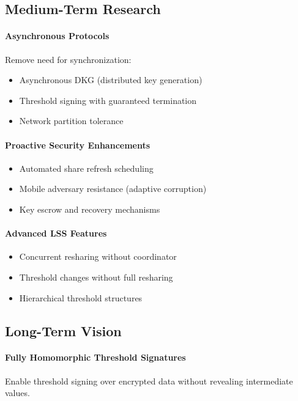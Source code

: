 \documentclass[11pt,twocolumn]{article}
\begin{document}
\subsection{Medium-Term Research}

\paragraph{Asynchronous Protocols} Remove need for synchronization:
\begin{itemize}
\item Asynchronous DKG (distributed key generation)
\item Threshold signing with guaranteed termination
\item Network partition tolerance
\end{itemize}

\paragraph{Proactive Security Enhancements}
\begin{itemize}
\item Automated share refresh scheduling
\item Mobile adversary resistance (adaptive corruption)
\item Key escrow and recovery mechanisms
\end{itemize}

\paragraph{Advanced LSS Features}
\begin{itemize}
\item Concurrent resharing without coordinator
\item Threshold changes without full resharing
\item Hierarchical threshold structures
\end{itemize}

\subsection{Long-Term Vision}

\paragraph{Fully Homomorphic Threshold Signatures} Enable threshold signing over encrypted data without revealing intermediate values.
\end{document}

